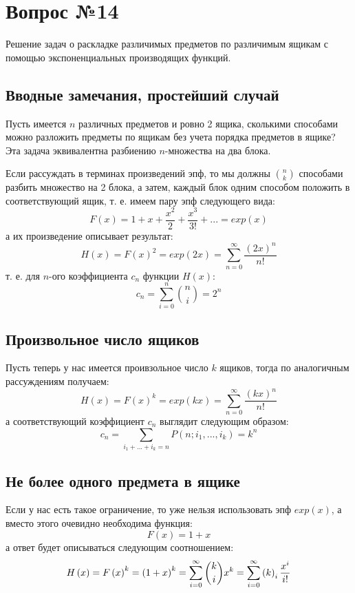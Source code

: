 \chapter{Вопрос №14}

Решение задач о раскладке различимых предметов по различимым ящикам с помощью экспоненциальных производящих функций.

\section{Вводные замечания, простейший случай}

Пусть имеется $n$ различных предметов и ровно 2 ящика, сколькими способами можно разложить предметы по ящикам без учета порядка предметов в ящике? Эта задача эквивалентна разбиению $n$-множества на два блока.

Если рассуждать в терминах произведений эпф, то мы должны $\binom{n}{k}$ способами разбить множество на 2 блока, а затем, каждый блок одним способом положить в соответствующий ящик, т. е. имеем пару эпф следующего вида:
\[
	F\left(x\right) = 1 + x + \frac{x^2}{2} + \frac{x^3}{3!} + ... = exp\left(x\right) 
\]
а их произведение описывает результат:
\[
	H\left(x\right) = F\left(x\right)^2 = exp\left(2x\right) = \sum_{n=0}^\infty \frac{\left(2x\right)^n}{n!}
\]
т. е. для $n$-ого коэффициента $c_n$ функции $H\left(x\right)$:
\[
	c_n = \sum_{i=0}^n \binom{n}{i} = 2^n
\]

\section{Произвольное число ящиков}

Пусть теперь у нас имеется проивзольное число $k$ ящиков, тогда по аналогичным рассуждениям получаем:
\[
	H\left(x\right) = F\left(x\right)^k = exp\left(kx\right) = \sum_{n=0}^\infty \frac{\left(kx\right)^n}{n!}
\]
а соответствующий коэффициент $c_n$ выглядит следующим образом:
\[
	c_n = \sum_{i_1+...+i_k=n}P\left(n;i_1,...,i_k\right) = k^n
\]

\section{Не более одного предмета в ящике}

Если у нас есть такое ограничение, то уже нельзя использовать эпф $exp\left(x\right)$, а вместо этого очевидно необходима функция:
\[
	F\left(x\right) = 1 + x
\]
а ответ будет описываться следующим соотношением:
\[
	H\left(x\right) = F\left(x\right)^k = \left(1+x\right)^k = \sum_{i=0}^\infty \binom{k}{i}x^k = \sum_{i=0}^\infty \left({k}\right)_{i} \frac{x^i}{i!}
\]

